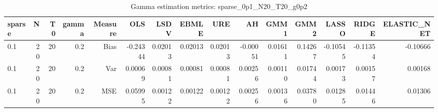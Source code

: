 \begin{table}[!htbp]\centering
\caption{Gamma estimation metrics: sparse_0p1_N20_T20_g0p2}
\label{tab:table1_sparse_0p1_N20_T20_g0p2}
\begin{tabular}{lrrrrrrrrrrrrrr}
\hline
sparse & N & T0 & gamma & Measure & OLS & LSDV & EBMLE & URE & AH & GMM1 & GMM2 & LASSO & RIDGE & ELASTIC_NET \\
\hline
0.1 & 20 & 20 & 0.2 & Bias & -0.24344 & 0.02013 & 0.02013 & 0.02013 & -0.00051 & 0.01611 & 0.14267 & -0.10545 & -0.11354 & -0.10666 \\
0.1 & 20 & 20 & 0.2 & Var & 0.00069 & 0.00081 & 0.00081 & 0.00081 & 0.00256 & 0.00110 & 0.01744 & 0.00173 & 0.00157 & 0.00168 \\
0.1 & 20 & 20 & 0.2 & MSE & 0.05995 & 0.00122 & 0.00122 & 0.00122 & 0.00256 & 0.00136 & 0.03780 & 0.01285 & 0.01446 & 0.01306 \\
\hline
\end{tabular}
\end{table}

